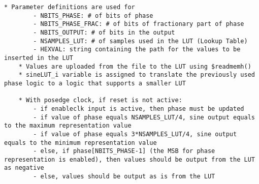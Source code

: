 \begin{lstlisting}[caption=Pseudo-code for an optimised implementation of the DDS]
	* Parameter definitions are used for
		- NBITS_PHASE: # of bits of phase
		- NBITS_PHASE_FRAC: # of bits of fractionary part of phase
		- NBITS_OUTPUT: # of bits in the output
		- NSAMPLES_LUT: # of samples used in the LUT (Lookup Table)
		- HEXVAL: string containing the path for the values to be inserted in the LUT
	* Values are uploaded from the file to the LUT using $readmemh()
	* sineLUT_i variable is assigned to translate the previously used phase logic to a logic that supports a smaller LUT
	
	* With posedge clock, if reset is not active:
		- if enableclk input is active, then phase must be updated
		- if value of phase equals NSAMPLES_LUT/4, sine output equals to the maximum representation value
		- if value of phase equals 3*NSAMPLES_LUT/4, sine output equals to the minimum representation value
		- else, if phase[NBITS_PHASE-1] (the MSB for phase representation is enabled), then values should be output from the LUT as negative
		- else, values should be output as is from the LUT
\end{lstlisting}













